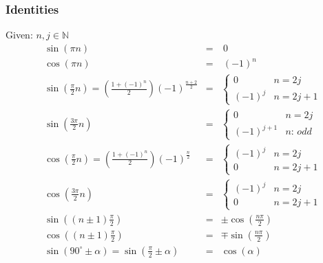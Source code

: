 \subsubsection{Identities}
Given: $n, j \in \mathbb{N}$
\begin{align*}
     & \sin(\pi n)                                                                                 & = & \: 0                                                       \\
     & \cos(\pi n)                                                                                 & = & \: {(-1)}^n                                                \\
     & \sin\left(\frac{\pi}{2}n\right) = \left(\frac{1 + {(-1)}^n}{2}\right){(-1)}^{\frac{n+2}{2}} & = & \begin{cases} 0 &n=2j \\ {(-1)}^j&n=2j+1 \end{cases}       \\
     & \sin\left(\frac{3\pi}{2}n\right)                                                            & = & \begin{cases} 0 &n=2j \\ {(-1)}^{j+1}&n:\, odd \end{cases} \\
     & \cos\left(\frac{\pi}{2}n\right) = \left(\frac{1+{(-1)}^n}{2}\right){(-1)}^{\frac{n}{2}}     & = & \begin{cases} {(-1)}^j &n=2j \\ 0 &n=2j+1 \end{cases}      \\
     & \cos\left(\frac{3\pi}{2}n\right)                                                            & = & \begin{cases} {(-1)}^{j} &n=2j \\ 0 &n=2j+1 \end{cases}    \\
     & \sin\left(\left(n\pm 1\right)\frac{\pi}{2}\right)                                           & = & \pm \cos\left(\frac{n\pi}{2}\right)                        \\
     & \cos\left(\left(n\pm 1\right)\frac{\pi}{2}\right)                                           & = & \mp \sin\left(\frac{n\pi}{2}\right)                        \\
     & \sin(90^\circ\pm\alpha) = \sin(\frac{\pi}{2} \pm \alpha)                                    & = & \cos(\alpha)                                               \\

\end{align*}
